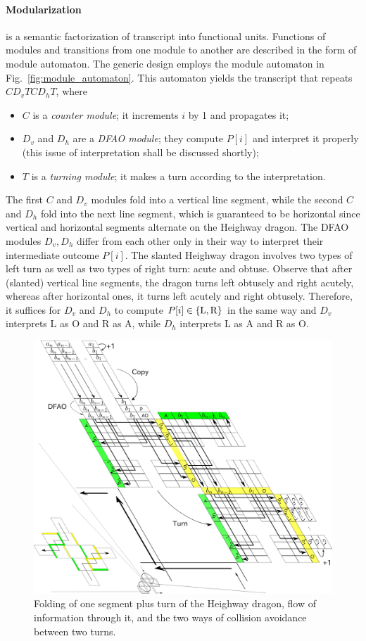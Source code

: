 \documentclass[runningheads]{llncs}
\begin{document}
\paragraph{Modularization} is a semantic factorization of transcript into functional units. 
Functions of modules and transitions from one module to another are described in the form of module automaton. 
The generic design employs the module automaton in Fig.~\ref{fig:module_automaton}.  
This automaton yields the transcript that repeats $C D_v T C D_h T$, where
\begin{itemize}
\item $C$ is a \textit{counter module}; it increments $i$ by 1 and propagates it; 
\item $D_v$ and $D_h$ are a \textit{DFAO module}; they compute $P[i]$ and interpret it properly (this issue of interpretation shall be discussed shortly); 
\item $T$ is a \textit{turning module}; it makes a turn according to the interpretation. 
\end{itemize}
The first $C$ and $D_v$ modules fold into a vertical line segment, while the second $C$ and $D_h$ fold into the next line segment, which is guaranteed to be horizontal since vertical and horizontal segments alternate on the Heighway dragon. 
The DFAO modules $D_v, D_h$ differ from each other only in their way to interpret their intermediate outcome $P[i]$. 
The slanted Heighway dragon involves two types of left turn as well as two types of right turn: acute and obtuse. 
Observe that after (slanted) vertical line segments, the dragon turns left obtusely and right acutely, whereas after horizontal ones, it turns left acutely and right obtusely. 
Therefore, it suffices for $D_v$ and $D_h$ to compute $P[i] \in \{{\rm L}, {\rm R}\}$ in the same way and $D_v$ interprets L as O and R as A, while $D_h$ interprets L as A and R as O. 

\begin{figure}[tb]
\centering
\includegraphics[width=0.8\linewidth]{Figs/dragon_vol5.png}
\caption{
Folding of one segment plus turn of the Heighway dragon, flow of information through it, and the two ways of collision avoidance between two turns.
}
\label{fig:abst_dragon}
\end{figure}
\end{document}
